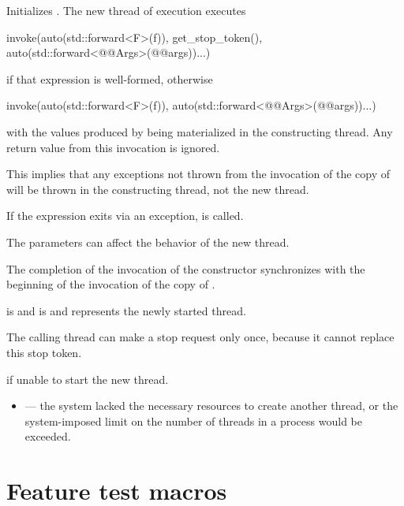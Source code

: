 \documentclass{wg21}
\begin{document}
\begin{itemdescr}
\pnum

\pnum
\effects
Initializes .
The new thread of execution executes
\begin{codeblock}
invoke(auto(std::forward<F>(f)), get_stop_token(),
       auto(std::forward<@@Args>(@@args))...)
\end{codeblock}
if that expression is well-formed,
otherwise
\begin{codeblock}
invoke(auto(std::forward<F>(f)), auto(std::forward<@@Args>(@@args))...)
\end{codeblock}
with the values produced by 
being materialized in the constructing thread.
Any return value from this invocation is ignored.
\begin{note}
This implies that any exceptions not thrown from the invocation of the copy
of  will be thrown in the constructing thread, not the new thread.
\end{note}
If the  expression exits via an exception,
 is called.

\begin{addedblock}
The parameters  can affect the behavior of the new thread.
\end{addedblock}

\pnum
\sync
The completion of the invocation of the constructor
synchronizes with the beginning of the invocation of the copy of .

\pnum
\ensures
{} is 
and  is 
and  represents the newly started thread.
\begin{note}
The calling thread can make a stop request only once,
because it cannot replace this stop token.
\end{note}

\pnum
\throws
{} if unable to start the new thread.

\pnum
\errors
\begin{itemize}
\item {} --- the system lacked
the necessary resources to create another thread,
or the system-imposed limit on the number of threads in a process
would be exceeded.
\end{itemize}
\end{itemdescr}

\section{Feature test macros}
\end{document}
